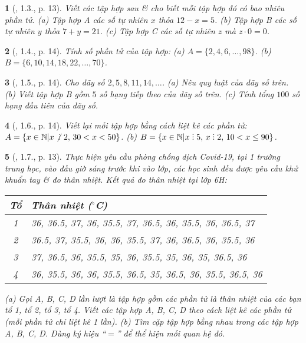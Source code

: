 \documentclass{article}
\newtheorem{baitoan}{}
\DeclareRobustCommand{\divby}{%
	\mathrel{\vbox{\baselineskip.65ex\lineskiplimit0pt\hbox{.}\hbox{.}\hbox{.}}}%
}
\begin{document}
\begin{baitoan}[\cite{Binh_boi_duong_Toan_6_tap_1}, 1.3., p. 13]
	Viết các tập hợp sau \& cho biết mỗi tập hợp đó có bao nhiêu phần tử. (a) Tập hợp A các số tự nhiên $x$ thỏa $12 - x = 5$. (b) Tập hợp B các số tự nhiên $y$ thỏa $7 + y = 21$. (c) Tập hợp C các số tự nhiên $z$ mà $z\cdot0 = 0$.
\end{baitoan}

\begin{baitoan}[\cite{Binh_boi_duong_Toan_6_tap_1}, 1.4., p. 14]
	Tính số phần tử của tập hợp: (a) $A = \{2,4,6,\ldots,98\}$. (b) $B = \{6,10,14,18,22,\ldots,70\}$.
\end{baitoan}

\begin{baitoan}[\cite{Binh_boi_duong_Toan_6_tap_1}, 1.5., p. 14]
	Cho dãy số $2,5,8,11,14,\ldots$. (a) Nêu quy luật của dãy số trên. (b) Viết tập hợp B gồm $5$ số hạng tiếp theo của dãy số trên. (c) Tính tổng $100$ số hạng đầu tiên của dãy số.
\end{baitoan}

\begin{baitoan}[\cite{Binh_boi_duong_Toan_6_tap_1}, 1.6., p. 14]
	Viết lại mỗi tập hợp bằng cách liệt kê các phần tử: $A = \{x\in\mathbb{N}|{x\not{\divby}\ 2},\,30 < x < 50\}$. (b) $B = \{x\in\mathbb{N}|x\divby5,\,x\divby2,\,10 < x\le90\}$.
\end{baitoan}

\begin{baitoan}[\cite{Binh_boi_duong_Toan_6_tap_1}, 1.7., p. 13]
	Thực hiện yêu cầu phòng chống dịch Covid-19, tại 1 trường trung học, vào đầu giờ sáng trước khi vào lớp, các học sinh đều được yêu cầu khử khuẩn tay \& đo thân nhiệt. Kết quả đo thân nhiệt tại lớp 6H:
	\begin{table}[H]
		\centering
		\begin{tabular}{|c|l|}
			\hline
			Tổ & Thân nhiệt (${}^\circ$C) \\
			\hline
			1 & 36, 36.5, 37, 36, 35.5, 37, 36.5, 36, 35.5, 36, 36.5, 37 \\
			\hline
			2 & 36.5, 37, 35.5, 36, 36, 35.5, 37, 36, 36.5, 36, 35.5, 36 \\
			\hline
			3 & 37, 36.5, 36, 35.5, 35, 36, 35.5, 35, 36, 35, 36.5, 36 \\
			\hline
			4 & 36, 35.5, 36, 36, 35.5, 36.5, 35, 36.5, 36, 35.5, 36.5, 36 \\
			\hline
		\end{tabular}
	\end{table}
	\noindent(a) Gọi A, B, C, D lần lượt là tập hợp gồm các phần tử là thân nhiệt của các bạn tổ 1, tổ 2, tổ 3, tổ 4. Viết các tập hợp A, B, C, D theo cách liệt kê các phần tử (mỗi phần tử chỉ liệt kê 1 lần). (b) Tìm cặp tập hợp bằng nhau trong các tập hợp A, B, C, D. Dùng ký hiệu ``$=$'' để thể hiện mối quan hệ đó.
\end{baitoan}
\end{document}
